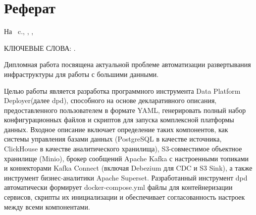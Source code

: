 \chapter*[Count-me]{Реферат} %
\thispagestyle{empty}%
%
%



На ~c.,  
,
,

{\MakeUppercase{Ключевые слова: \keywordsRu}.} %


Дипломная работа посвящена актуальной проблеме автоматизации развертывания инфраструктуры для работы с большими данными. 

Целью работы является разработка программного инструмента Data Platform Deployer(далее dpd), способного на основе декларативного описания, предоставленного пользователем в формате YAML, генерировать полный набор конфигурационных файлов и скриптов для запуска комплексной платформы данных. Входное описание включает определение таких компонентов, как системы управления базами данных (PostgreSQL в качестве источника, ClickHouse в качестве аналитического хранилища), S3-совместимое объектное хранилище (Minio), брокер сообщений Apache Kafka с настроенными топиками и коннекторами Kafka Connect (включая Debezium для CDC и S3 Sink), а также инструмент бизнес-аналитики Apache Superset. Разработанный инструмент dpd автоматически формирует docker-compose.yml файлы для контейнеризации сервисов, скрипты их инициализации и обеспечивает согласованность настроек между всеми компонентами. 

